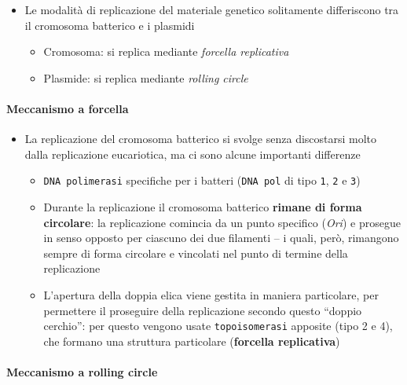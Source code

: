 \documentclass[italian,]{article}
\providecommand{\tightlist}{%
  \setlength{\itemsep}{0pt}\setlength{\parskip}{0pt}}
\newcommand{\asidefigure}[2]{\marginpar{\phantom{Img:}\newline\texttt{[image: \#1]}\\\footnotesize\emph{#2}}}
\begin{document}
\begin{itemize}
\tightlist
\item
  Le modalità di replicazione del materiale genetico solitamente
  differiscono tra il cromosoma batterico e i plasmidi

  \begin{itemize}
  \tightlist
  \item
    Cromosoma: si replica mediante \emph{forcella replicativa}
  \item
    Plasmide: si replica mediante \emph{rolling circle}
  \end{itemize}
\end{itemize}

\hypertarget{meccanismo-a-forcella}{%
\paragraph{Meccanismo a forcella}\label{meccanismo-a-forcella}}

\begin{itemize}
\tightlist
\item
  La replicazione del cromosoma batterico si svolge senza discostarsi
  molto dalla replicazione eucariotica, ma ci sono alcune importanti
  differenze

  \begin{itemize}
  \tightlist
  \item
    \texttt{DNA\ polimerasi} specifiche per i batteri (\texttt{DNA\ pol}
    di tipo \texttt{1}, \texttt{2} e \texttt{3})
  \item
    Durante la replicazione il cromosoma batterico \textbf{rimane di
    forma circolare}: la replicazione comincia da un punto specifico
    (\emph{Ori}) e prosegue in senso opposto per ciascuno dei due
    filamenti -- i quali, però, rimangono sempre di forma circolare e
    vincolati nel punto di termine della replicazione
    \asidefigure{img/replicazione-batterica.png}{}
  \item
    L'apertura della doppia elica viene gestita in maniera particolare,
    per permettere il proseguire della replicazione secondo questo
    ``doppio cerchio'': per questo vengono usate \texttt{topoisomerasi}
    apposite (tipo 2 e 4), che formano una struttura particolare
    (\textbf{forcella replicativa})
  \end{itemize}
\end{itemize}

\hypertarget{meccanismo-a-rolling-circle}{%
\paragraph{Meccanismo a rolling
circle}\label{meccanismo-a-rolling-circle}}
\end{document}

